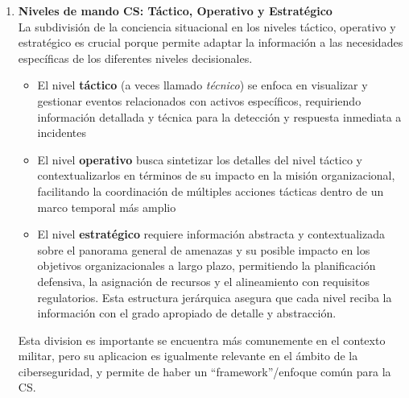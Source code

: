 \begin{enumerate}[resume]
\item \textbf{Niveles de mando CS: Táctico, Operativo y Estratégico} \\
La subdivisión de la conciencia situacional en los niveles táctico, operativo y estratégico es crucial porque permite adaptar la información a las necesidades específicas de los diferentes niveles decisionales. 
\begin{itemize}
   \item El nivel \textbf{táctico} (a veces llamado \textit{técnico}) se enfoca en visualizar y gestionar eventos relacionados con activos específicos, requiriendo información detallada y técnica para la detección y respuesta inmediata a incidentes
   \item El nivel \textbf{operativo} busca sintetizar los detalles del nivel táctico y contextualizarlos en términos de su impacto en la misión organizacional, facilitando la coordinación de múltiples acciones tácticas dentro de un marco temporal más amplio
   \item El nivel \textbf{estratégico} requiere información abstracta y contextualizada sobre el panorama general de amenazas y su posible impacto en los objetivos organizacionales a largo plazo, permitiendo la planificación defensiva, la asignación de recursos y el alineamiento con requisitos regulatorios. Esta estructura jerárquica asegura que cada nivel reciba la información con el grado apropiado de detalle y abstracción.
\end{itemize}

Esta division es importante se encuentra más comunemente en el contexto militar, pero su aplicacion es igualmente relevante en el ámbito de la ciberseguridad, y permite de haber un ``framework''/enfoque común para la CS.
\end{enumerate}